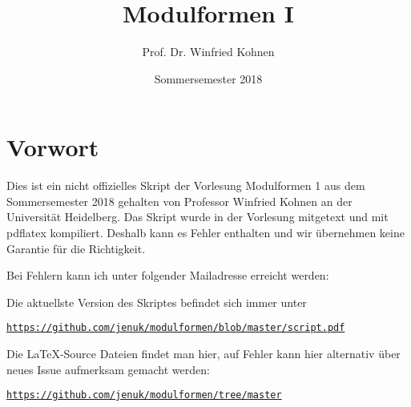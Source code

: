 \documentclass[parskip=half]{scrbook}
\title{Modulformen I}
\author{Prof. Dr. Winfried Kohnen}
\date{Sommersemester 2018}
\begin{document}
\pagestyle{plain}

\maketitle

\chapter*{Vorwort}

Dies ist ein nicht offizielles Skript der Vorlesung Modulformen 1 aus dem Sommersemester 2018 gehalten von Professor Winfried Kohnen an der Universität Heidelberg.
Das Skript wurde in der Vorlesung mitgetext und mit pdflatex kompiliert.
Deshalb kann es Fehler enthalten und wir übernehmen keine Garantie für die Richtigkeit.

Bei Fehlern kann ich unter folgender Mailadresse erreicht werden:

\begin{center}
\end{center}

Die aktuellste Version des Skriptes befindet sich immer unter
\begin{center}
\texttt{\url{https://github.com/jenuk/modulformen/blob/master/script.pdf}}
\end{center}

Die \LaTeX-Source Dateien findet man hier, auf Fehler kann hier alternativ über neues Issue aufmerksam gemacht werden:
\begin{center}
\texttt{\url{https://github.com/jenuk/modulformen/tree/master}}
\end{center}

\clearpage
{}
{}
\tableofcontents

\clearpage
{}
\setcounter{page}{0}
\pagestyle{fancy}














\appendix


\printindex

\end{document}
